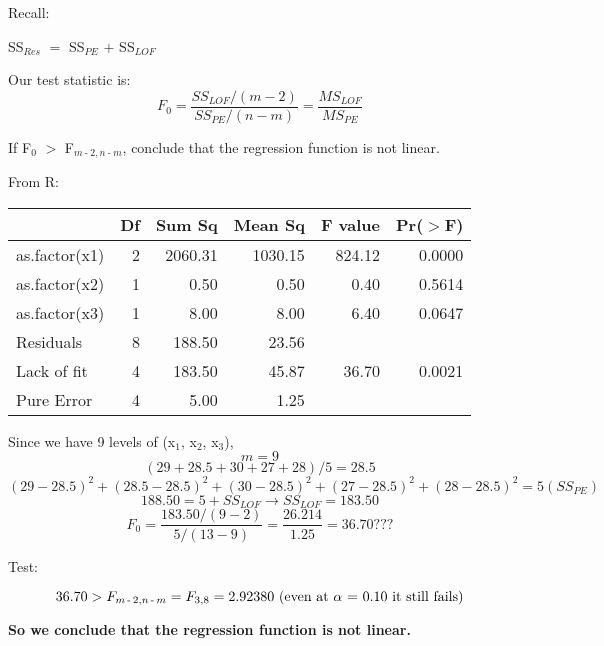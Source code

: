 \documentclass{article}
\newcommand{\mt}[1]{\ensuremath{#1}}
\newcommand{\afa}{\mt{\alpha} }
\newcommand{\lra}{ \mt{\longrightarrow} } %
\newcommand{\ps}{\mt{\operatorname{+}} }
\newcommand{\ms}{\mt{\operatorname{-}} }
\newcommand{\gr}{\mt{\operatorname{>}} }
\newcommand{\eql}{ \mt{\operatorname{=}} }
\newcommand{\uw}[2]{#1\mt{_{#2}}}
\newcommand{\eqn}[1]{\[#1\]}
\begin{document}
{{Recall:

\uw{SS}{Res} \eql \uw{SS}{PE} \ps \uw{SS}{LOF}

Our test statistic is:
\eqn{F_0 = \frac{SS_{LOF} / (m - 2)}{SS_{PE} / (n - m)} = \frac{MS_{LOF}}{MS_{PE}}}

If \uw{F}{0} \gr \uw{F}{m \ms 2, n \ms m}, conclude that the regression function is not linear.

From R:

\begin{table}[ht]
\centering
\begin{tabular}{lrrrrr}
  \hline
 & Df & Sum Sq & Mean Sq & F value & Pr($>$F) \\ 
  \hline
as.factor(x1) & 2 & 2060.31 & 1030.15 & 824.12 & 0.0000 \\ 
  as.factor(x2) & 1 & 0.50 & 0.50 & 0.40 & 0.5614 \\ 
  as.factor(x3) & 1 & 8.00 & 8.00 & 6.40 & 0.0647 \\ 
  Residuals & 8 & 188.50 & 23.56 &  &  \\ 
   Lack of fit & 4 & 183.50 & 45.87 & 36.70 & 0.0021 \\ 
   Pure Error & 4 & 5.00 & 1.25 &  &  \\ 
   \hline
\end{tabular}
\end{table}

Since we have 9 levels of (\uw{x}{1}, \uw{x}{2}, \uw{x}{3}),
\eqn{m = 9}
\eqn{(29 + 28.5 + 30 + 27 + 28) / 5 = 28.5}
\eqn{(29 - 28.5)^2 + (28.5 - 28.5)^2 + (30 - 28.5)^2 + (27 - 28.5)^2 + (28 - 28.5)^2 \eql 5 (SS_{PE})}
\eqn{188.50 = 5 + SS_{LOF} \lra SS_{LOF} = 183.50}
\eqn{F_0 = \frac{183.50 / (9 - 2)}{5 / (13 - 9)} = \frac{26.214}{1.25} = 36.70???}

Test:

\eqn{36.70 > \uw{F}{m \ms 2, n \ms m} = F_{3, 8} = 2.92380 \textrm{ (even at \afa \eql 0.10 it still fails)}}

\textbf{So we conclude that the regression function is not linear.}

}

}

\newpage
\end{document}
